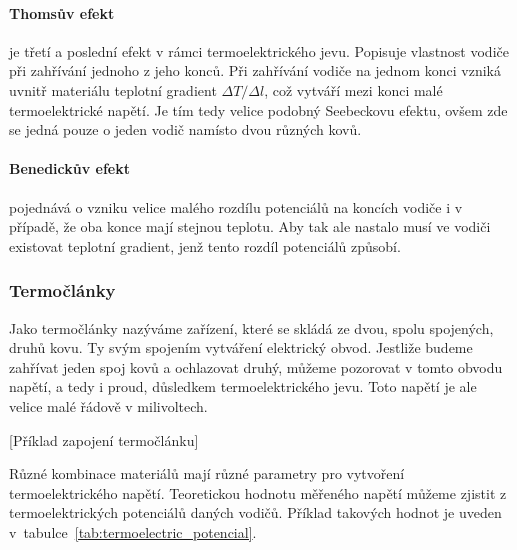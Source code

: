 \paragraph{Thomsův efekt} je třetí a poslední efekt v rámci termoelektrického
jevu.  Popisuje vlastnost vodiče při zahřívání jednoho z jeho konců. Při
zahřívání vodiče na jednom konci vzniká uvnitř materiálu teplotní gradient
$\Delta T/\Delta l$, což vytváří mezi konci malé termoelektrické napětí. Je tím
tedy velice podobný Seebeckovu efektu, ovšem zde se jedná pouze o jeden vodič
namísto dvou různých kovů.~\cite{jreichl-thomson}

\paragraph{Benedickův efekt} pojednává o vzniku velice malého rozdílu
potenciálů na koncích vodiče i v případě, že oba konce mají stejnou teplotu.
Aby tak ale nastalo musí ve vodiči existovat teplotní gradient, jenž tento
rozdíl potenciálů způsobí.~\cite{diplomka} 

\subsubsection{Termočlánky}
Jako termočlánky nazýváme zařízení, které se skládá ze dvou, spolu spojených,
druhů kovu. Ty svým spojením vytváření elektrický obvod. Jestliže budeme
zahřívat jeden spoj kovů a ochlazovat druhý, můžeme pozorovat v tomto obvodu
napětí, a tedy i proud, důsledkem termoelektrického jevu. Toto napětí je ale
velice malé řádově v milivoltech.

[Příklad zapojení
termočlánku]

Různé kombinace materiálů mají různé parametry pro vytvoření termoelektrického 
napětí. Teoretickou hodnotu měřeného napětí můžeme zjistit z termoelektrických
potenciálů daných vodičů. Příklad takových hodnot je uveden 
v~tabulce~\ref{tab:termoelectric_potencial}.

